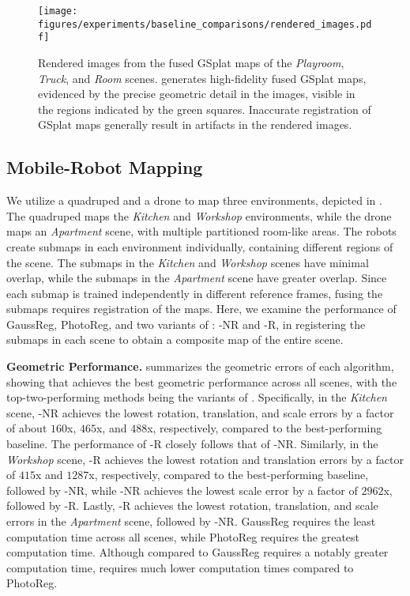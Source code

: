  

\begin{figure*}[th]
    \centering
    \texttt{[image: figures/experiments/baseline\_comparisons/rendered\_images.pdf]}
    \caption{Rendered images from the fused GSplat maps of the \emph{Playroom}, \emph{Truck}, and \emph{Room} scenes. \algname generates high-fidelity fused GSplat maps, evidenced by the precise geometric detail in the images, visible in the regions indicated by the green squares. Inaccurate registration of GSplat maps generally result in artifacts in the rendered images.}
    \label{fig:photometric_performance_rendered_images}
\end{figure*}


\subsection{Mobile-Robot Mapping}
We utilize a quadruped and a drone to map three environments, depicted in . The quadruped maps the \emph{Kitchen} and \emph{Workshop} environments, while the drone maps an \emph{Apartment} scene, with multiple partitioned room-like areas. The robots create submaps in each environment individually, containing different regions of the scene. The submaps in the \emph{Kitchen} and \emph{Workshop} scenes have minimal overlap, while the submaps in the \emph{Apartment} scene have greater overlap. Since each submap is trained independently in different reference frames, fusing the submaps requires registration of the maps. Here, we examine the performance of GaussReg, PhotoReg, and two variants of \algname: \algname-NR and \algname-R, in registering the submaps in each scene to obtain a composite map of the entire scene.

\smallskip
\noindent\textbf{Geometric Performance.}
 summarizes the geometric errors of each algorithm, showing that \algname achieves the best geometric performance across all scenes, with the top-two-performing methods being the variants of \algname. Specifically, in the \emph{Kitchen} scene, \algname-NR achieves the lowest rotation, translation, and scale errors by a factor of about $160$x, $465$x, and $488$x, respectively, compared to the best-performing baseline. The performance of \algname-R closely follows that of \algname-NR. Similarly, in the \emph{Workshop} scene, \algname-R achieves the lowest rotation and translation errors by a factor of $415$x and $1287$x, respectively, compared to the best-performing baseline, followed by \algname-NR, while \algname-NR achieves the lowest scale error by a factor of $2962$x, followed by \algname-R. Lastly, \algname-R achieves the lowest rotation, translation, and scale errors in the \emph{Apartment} scene, followed by \algname-NR. GaussReg requires the least computation time across all scenes, while PhotoReg requires the greatest computation time. Although compared to GaussReg \algname requires a notably greater computation time, \algname requires much lower computation times compared to PhotoReg.

